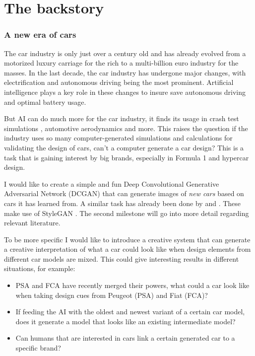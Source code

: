 \part{The backstory}
\label{part:backstory}


\section{A new era of cars}
\label{sec:new_era}

The car industry is only just over a century old and has already evolved from a motorized luxury carriage for the rich to a multi-billion euro industry for the masses.
In the last decade, the car industry has undergone major changes, with electrification and autonomous driving being the most prominent.
Artificial intelligence plays a key role in these changes to insure save autonomous driving and optimal battery usage.

But AI can do much more for the car industry, it finds its usage in crash test simulations \citep{crashtest}, automotive aerodynamics \citep{carearo} and more.
This raises the question if the industry uses so many computer-generated simulations and calculations for validating the design of cars, can't a computer generate a car design?
This is a task that is gaining interest by big brands, especially in Formula 1 and hypercar design.

I would like to create a simple and fun Deep Convolutional Generative Adversarial Network (DCGAN) that can generate images of \textit{new cars} based on cars it has learned from. 
A similar task has already been done by \citet{cnnnewcar} and \citet{cybertruckguess}. 
These make use of StyleGAN \citep{stylegan}. 
The second milestone will go into more detail regarding relevant literature.

To be more specific I would like to introduce a creative system that can generate a creative interpretation of what a car could look like when design elements from different car models are mixed. 
This could give interesting results in different situations, for example:
\begin{itemize}
    \item PSA and FCA have recently merged their powers, what could a car look like when taking design cues from Peugeot (PSA) and Fiat (FCA)?
    \item If feeding the AI with the oldest and newest variant of a certain car model, does it generate a model that looks like an existing intermediate model?
    \item Can humans that are interested in cars link a certain generated car to a specific brand? 
\end{itemize}



